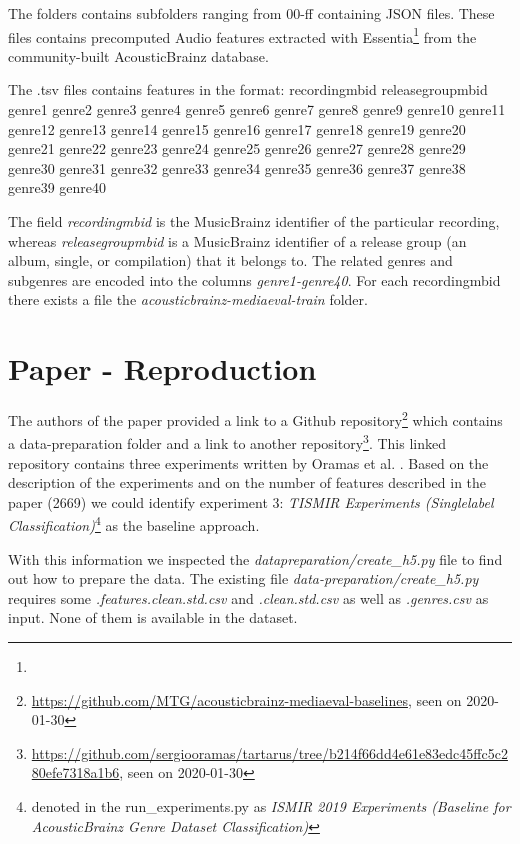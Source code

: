 \documentclass[sigconf,nonacm]{acmart}
\begin{document}
The folders contains subfolders ranging from 00-ff containing JSON files. These files contains precomputed Audio features extracted with Essentia\footnote{} from the community-built AcousticBrainz database.

The .tsv files contains features in the format:
recordingmbid   releasegroupmbid        genre1  genre2  genre3  genre4  genre5  genre6  genre7  genre8  genre9   genre10 genre11 genre12 genre13 genre14 genre15 genre16 genre17 genre18 genre19 genre20 genre21 genre22  genre23 genre24 genre25 genre26 genre27 genre28 genre29 genre30 genre31 genre32 genre33 genre34 genre35  genre36 genre37 genre38 genre39 genre40

The field \textit{recordingmbid} is the MusicBrainz identifier of the particular recording, whereas \textit{releasegroupmbid} is a MusicBrainz identifier of a release group (an album, single, or compilation) that it belongs to. The related genres and subgenres are encoded into the columns \textit{genre1-genre40}.
For each recordingmbid there exists a file the \textit{acousticbrainz-mediaeval-train} folder.



\section{Paper - Reproduction}

The authors of the paper provided a link to a Github repository\footnote{\url{https://github.com/MTG/acousticbrainz-mediaeval-baselines}, seen on 2020-01-30} which contains a data-preparation folder and a link to another repository\footnote{\url{https://github.com/sergiooramas/tartarus/tree/b214f66dd4e61e83edc45ffc5c280efe7318a1b6}, seen on 2020-01-30}. 
This linked repository contains three experiments written by Oramas et al. . Based on the description of the experiments and on the number of features described in the paper (2669) we could identify experiment 3: \textit{TISMIR Experiments (Single\-label Classification)}\footnote{denoted in the run\_experiments.py as \textit{ISMIR 2019 Experiments (Baseline for AcousticBrainz Genre Dataset Classification)}} as the baseline approach.

With this information we inspected the \textit{data\-preparation/create\_h5.py} file to find out how to prepare the data. The existing file \textit{data-preparation/create\_h5.py} requires some \textit{.features.clean.std.csv} and \textit{.clean.std.csv} as well as \textit{.genres.csv} as input. None of them is available in the dataset.
\end{document}
